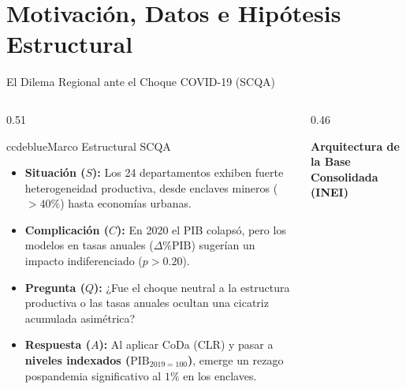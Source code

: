 \section{Motivación, Datos e Hipótesis Estructural}

\begin{frame}{El Dilema Regional ante el Choque COVID-19 (SCQA)}
\vspace{-0.18cm}
\begin{columns}[T,onlytextwidth]
\begin{column}{0.51\textwidth}
\begin{contrastbox}{ccdeblue}{Marco Estructural SCQA}
\scriptsize\RaggedRight
\begin{itemize}\setlength{\itemsep}{0.06em}
  \item \textbf{Situación ($S$):} Los 24 departamentos exhiben fuerte heterogeneidad productiva, desde enclaves mineros ($>40\%$) hasta economías urbanas.
  \item \textbf{Complicación ($C$):} En 2020 el PIB colapsó, pero los modelos en tasas anuales ($\Delta\%\text{PIB}$) sugerían un impacto indiferenciado ($p > 0.20$).
  \item \textbf{Pregunta ($Q$):} ¿Fue el choque neutral a la estructura productiva o las tasas anuales ocultan una cicatriz acumulada asimétrica?
  \item \textbf{Respuesta ($A$):} Al aplicar CoDa (CLR) y pasar a \textbf{niveles indexados ($\text{PIB}_{2019=100}$)}, emerge un rezago pospandemia significativo al $1\%$ en los enclaves.
\end{itemize}
\end{contrastbox}
\end{column}

\begin{column}{0.46\textwidth}
\begin{ccdebox}[left=2mm,right=2mm,top=1mm,bottom=1mm]
\scriptsize
\textbf{\textcolor{ccdenavy}{Arquitectura de la Base Consolidada (INEI)}}
\vspace{0.04cm}

\end{ccdebox}


\end{column}
\end{columns}
\end{frame}
